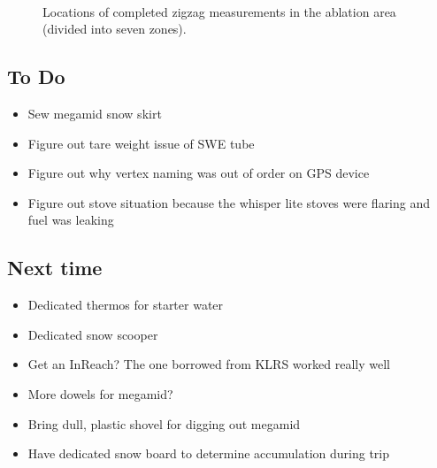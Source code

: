 \documentclass[12pt]{article}
\begin{document}
\begin{landscape}
\begin{figure}
	\centering
	\\
	\caption{Locations of completed zigzag measurements in the ablation area (divided into seven zones).}
	\label{zigzag_completed}
\end{figure}
\end{landscape}


\subsection{To Do}
\begin{itemize}
\item Sew megamid snow skirt
\item Figure out tare weight issue of SWE tube
\item Figure out why vertex naming was out of order on GPS device
\item Figure out stove situation because the whisper lite stoves were flaring and fuel was leaking
\end{itemize} 

\subsection{Next time}
\begin{itemize}
\item Dedicated thermos for starter water
\item Dedicated snow scooper
\item Get an InReach? The one borrowed from KLRS worked really well
\item More dowels for megamid?
\item Bring dull, plastic shovel for digging out megamid
\item Have dedicated snow board to determine accumulation during trip
\end{itemize}
\end{document}
